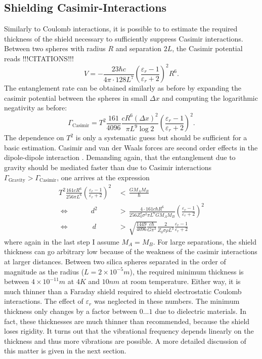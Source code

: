\subsection{Shielding Casimir-Interactions}
Similarly to Coulomb interactions, it is possible to to estimate the required thickness of the shield necessary to sufficiently suppress Casimir interactions. Between two spheres with radius $R$ and separation $2L$, the Casimir potential reads !!!CITATIONS!!!
\begin{equation}
  V = -\frac{23 \hbar c}{4\pi \cdot 128 L^7} \left( \frac{\varepsilon_r - 1}{\varepsilon_r + 2} \right)^2 R^6 .
\end{equation}
The entanglement rate can be obtained similarly as before by expanding the casimir potential between the spheres in small $\Delta x$ and computing the logarithmic negativity as before:
\begin{equation}
  \Gamma_\mathrm{Casimir} = T^2 \frac{161}{4096} \frac{c R^6 (\Delta x)^2}{\pi L^9 \log 2}\left( \frac{\varepsilon_r - 1}{\varepsilon_r + 2}\right)^2 .
\end{equation}
The dependence on $T^2$ is only a systematic guess but should be sufficient for a basic estimation. Casimir and van der Waals forces are second order effects in the dipole-dipole interaction \cite{Bordag_2001}.
Demanding again, that the entanglement due to gravity should be mediated faster than due to Casimir interactions $\Gamma_\mathrm{Gravity} > \Gamma_\mathrm{Casimir}$, one arrives at the expression
\begin{align}
  T^2 \frac{161 c R^6}{256 \pi L^6} \left( \frac{\varepsilon_r - 1}{\varepsilon_r + 2}\right)^2 \, &< \, \frac{G M_A M_B}{\hbar} \\
  \Longleftrightarrow \quad\quad\quad d^2 \, &> \, \frac{4 \cdot 161 c \hbar R^6}{256 Z_0^2 \sigma^2 \pi L^6 G M_A M_B} \left( \frac{\varepsilon_r - 1}{\varepsilon_r + 2}\right)^2 \\
  \Longleftrightarrow \quad\quad\quad\  d \, &> \, \sqrt{\frac{1449}{4096} \frac{c \hbar}{G \pi^3}} \frac{2}{Z_0 \sigma \rho L^3} \frac{\varepsilon_r - 1}{\varepsilon_r + 2}
\end{align}
where again in the last step I assume $M_A = M_B$. For large separations, the shield thickness can go arbitrary low because of the weakness of the casimir interactions at larger distances. Between two silica spheres separated in the order of magnitude as the radius ($L = 2\times 10^{-5}\si{m}$), the required minimum thickness is between $4\times 10^{-11}\si{m}$ at $4\si{K}$ and $10 \si{nm}$ at room temperature.
Either way, it is much thinner than a Faraday shield required to shield electrostatic Coulomb interactions. The effect of $\varepsilon_r$ was neglected in these numbers. The minimum thickness only changes by a factor between $0...1$ due to dielectric materials.
In fact, these thicknesses are much thinner than recommended, because the shield loses rigidity.
It turns out that the vibrational frequency depends linearly on the thickness and thus more vibrations are possible. A more detailed discussion of this matter is given in the next section.


